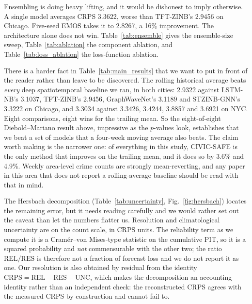\documentclass[journal,10pt,twocolumn]{IEEEtran}
\begin{document}
Ensembling is doing heavy lifting, and it would be dishonest to imply otherwise.
A single model averages CRPS 3.3622, worse than TFT-ZINB's 2.9456 on Chicago.
Five-seed EMOS takes it to 2.8267, a 16\% improvement. The architecture alone
does not win. Table~\ref{tab:ensemble} gives the ensemble-size sweep,
Table~\ref{tab:ablation} the component ablation, and
Table~\ref{tab:loss_ablation} the loss-function ablation.

There is a harder fact in Table~\ref{tab:main_results} that we want to put in
front of the reader rather than leave to be discovered. The rolling historical
average beats \emph{every} deep spatiotemporal baseline we ran, in both cities:
2.9322 against LSTM-NB's 3.1037, TFT-ZINB's 2.9456, GraphWaveNet's 3.1189 and
STZINB-GNN's 3.3222 on Chicago, and 3.3034 against 3.3426, 3.4244, 3.8857 and
3.6921 on NYC. Eight comparisons, eight wins for the trailing mean. So the
eight-of-eight Diebold--Mariano result above, impressive as the $p$-values look,
establishes that we beat a set of models that a four-week moving average also
beats. The claim worth making is the narrower one: of everything in this study,
CIVIC-SAFE is the only method that improves on the trailing mean, and it does so
by 3.6\% and 4.9\%. Weekly area-level crime counts are strongly mean-reverting,
and any paper in this area that does not report a rolling-average baseline should
be read with that in mind.







The Hersbach decomposition (Table~\ref{tab:uncertainty}, Fig.~\ref{fig:hersbach})
locates the remaining error, but it needs reading carefully and we would rather
set out the caveat than let the numbers flatter us. Resolution and climatological
uncertainty are on the count scale, in CRPS units. The reliability term as we
compute it is a Cram\'er--von Mises-type statistic on the cumulative PIT, so it
is a squared probability and \emph{not} commensurable with the other two; the
ratio $\mathrm{REL}/\mathrm{RES}$ is therefore not a fraction of forecast loss
and we do not report it as one. Our resolution is also obtained by residual from
the identity $\mathrm{CRPS} = \mathrm{REL} - \mathrm{RES} + \mathrm{UNC}$, which
makes the decomposition an accounting identity rather than an independent check:
the reconstructed CRPS agrees with the measured CRPS by construction and cannot
fail to.
\end{document}
